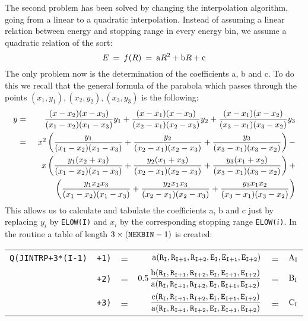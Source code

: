 The second problem has been solved by changing the interpolation algorithm,
going from a linear to a quadratic interpolation. Instead of assuming
a linear relation between energy and stopping range in every energy bin,
we assume a quadratic relation of the sort:
\[ E \: = \: f(R) \: = \: {\rm a} R^2 + {\rm b} R + {\rm c} \]
The only problem now is the determination of the coefficients a, b and
c. To do this we recall that the general formula of the parabola which
passes through the points $(x_1,y_1), (x_2,y_2), (x_3,y_3)$ is the
following:
\begin{eqnarray*}
y & = & \displaystyle{
\frac{(x-x_2)(x-x_3)}{(x_1-x_2)(x_1-x_3)}y_1 +
\frac{(x-x_1)(x-x_3)}{(x_2-x_1)(x_2-x_3)}y_2 +
\frac{(x-x_1)(x-x_2)}{(x_3-x_1)(x_3-x_2)}y_3} \vspace{.3cm} \\
& = & \displaystyle{
\makebox[.5cm][r]{$x^2$} \left ( \frac{y_1}{(x_1-x_2)(x_1-x_3)}+
            \frac{y_2}{(x_2-x_1)(x_2-x_3)}+
            \frac{y_3}{(x_3-x_1)(x_3-x_2)} \right ) -} \vspace{.3cm} \\
&   & \displaystyle{
\makebox[.5cm][r]{$x$} \left ( \frac{y_1(x_2+x_3)}{(x_1-x_2)(x_1-x_3)}+
            \frac{y_2(x_1+x_3)}{(x_2-x_1)(x_2-x_3)}+
            \frac{y_3(x_1+x_2)}{(x_3-x_1)(x_3-x_2)} \right ) +}
                                                       \vspace{.3cm} \\
&   & \displaystyle{
\makebox[.5cm][r]{} \left ( \frac{y_1x_2x_3}{(x_1-x_2)(x_1-x_3)}+
            \frac{y_2x_1x_3}{(x_2-x_1)(x_2-x_3)}+
            \frac{y_3x_1x_2}{(x_3-x_1)(x_3-x_2)} \right )} \vspace{.3cm}
\end{eqnarray*}
This allows us to calculate and tabulate the coefficients a, b and c
just by replacing $y_i$ by {\tt ELOW(I)} and $x_i$ by the corresponding
stopping range {\tt ELOW(}$i${\tt )}.
In the routine  a table of length $3 \times (\mbox{\tt NEKBIN}
-1)$
is created: \\
 
\begin{tabular}{r@{}lcrcl}
{\tt Q(JINTRP+3*(I-1)} & {\tt +1)} & = &
${\rm a}({\tt R_I,R_{I+1},R_{I+2},E_I,E_{I+1},E_{I+2}})$
& = & ${\rm A_I}$  \vspace{.3cm} \\
& {\tt +2)} & = &
$\displaystyle{0.5 \,
\frac{{\rm b}({\tt R_I,R_{I+1},R_{I+2},E_I,E_{I+1},E_{I+2}})}
{{\rm a}({\tt R_I,R_{I+1},R_{I+2},E_I,E_{I+1},E_{I+2}})}}$
& = & ${\rm B_I}$ \vspace{.3cm} \\
& {\tt +3)} & = &
$\displaystyle{
\frac{{\rm c}({\tt R_I,R_{I+1},R_{I+2},E_I,E_{I+1},E_{I+2}})}
{{\rm a}({\tt R_I,R_{I+1},R_{I+2},E_I,E_{I+1},E_{I+2}})}}$
& = & ${\rm C_I}$ \vspace{.3cm} \\
\end{tabular}

